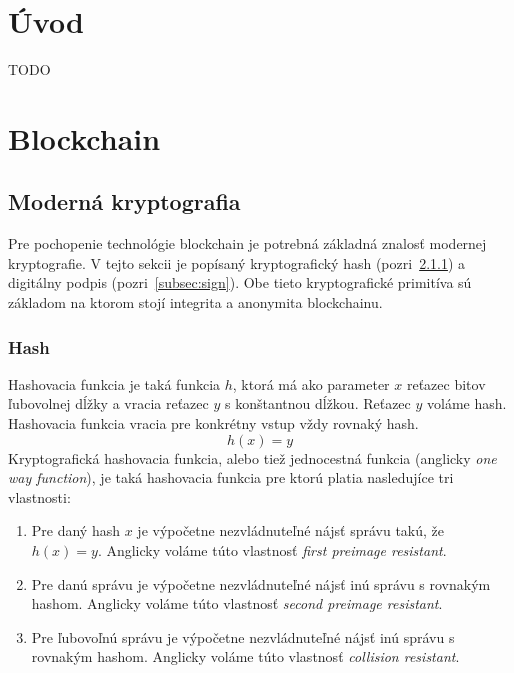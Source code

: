 \chapter{Úvod}
TODO

\chapter{Blockchain}\label{chap:blockchain}

\section{Moderná kryptografia}\label{sec:crypto}
Pre pochopenie technológie blockchain je potrebná základná znalosť modernej kryptografie. V tejto sekcii je popísaný kryptografický hash (pozri~\ref{subsec:hash}) a digitálny podpis (pozri~\ref{subsec:sign}). Obe tieto kryptografické primitíva sú základom na ktorom stojí integrita a anonymita blockchainu.

\subsection{Hash}\label{subsec:hash}
Hashovacia funkcia je taká funkcia $h$, ktorá má ako parameter $x$ reťazec bitov ľubovolnej dĺžky a vracia reťazec $y$ s konštantnou dĺžkou. Reťazec $y$ voláme hash. Hashovacia funkcia vracia pre konkrétny vstup vždy rovnaký hash.
$$ h(x) = y $$
Kryptografická hashovacia funkcia, alebo tiež jednocestná funkcia (anglicky \textit{one way function}), je taká hashovacia funkcia pre ktorú platia nasledujíce tri vlastnosti:
\begin{enumerate}
	\item Pre daný hash $x$ je výpočetne nezvládnuteľné nájsť správu takú, že $ h(x) = y $. Anglicky voláme túto vlastnosť \textit{first preimage resistant}.
	\item Pre danú správu je výpočetne nezvládnuteľné nájsť inú správu s rovnakým hashom. Anglicky voláme túto vlastnosť \textit{second preimage resistant}.
	\item Pre ľubovoľnú správu je výpočetne nezvládnuteľné nájsť inú správu s rovnakým hashom. Anglicky voláme túto vlastnosť \textit{collision resistant}.
\end{enumerate}

